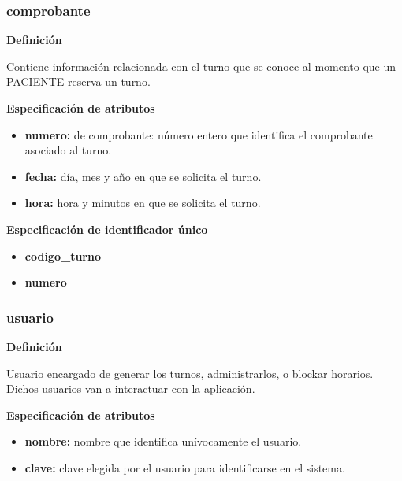 \documentclass[a4paper,11pt]{article}
\begin{document}
\subsubsection{\textbf{comprobante}}

\textbf{Definición}

Contiene información relacionada con el turno que se conoce al momento que un 
PACIENTE reserva un turno.

\textbf{Especificación de atributos}

\begin{itemize}

     \item \textbf{numero:} de comprobante: número entero que identifica el comprobante asociado 
     al turno.

     \item \textbf{fecha:} día, mes y año en que se solicita el turno.

     \item \textbf{hora:} hora y minutos en que se solicita el turno.

\end{itemize}

\textbf{Especificación de identificador único}

\begin{itemize}

     \item \textbf{codigo\_turno}

     \item \textbf{numero}

\end{itemize}

\subsubsection{\textbf{usuario}}

\textbf{Definición}

Usuario encargado de generar los turnos, administrarlos, o blockar horarios.
Dichos usuarios van a interactuar con la aplicación.

\textbf{Especificación de atributos}

\begin{itemize}

     \item \textbf{nombre:} nombre que identifica unívocamente el usuario. 
	 
	 \item \textbf{clave:} clave elegida por el usuario para identificarse en el sistema. 
\end{itemize}
\end{document}
